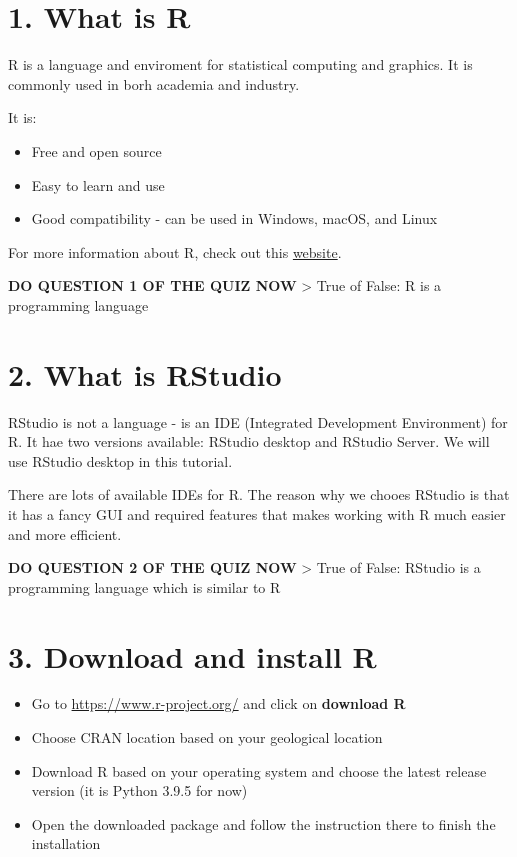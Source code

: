 \documentclass[
]{book}
\begin{document}
\hypertarget{what-is-r}{%
\section{1. What is R}\label{what-is-r}}

R is a language and enviroment for statistical computing and graphics. It is commonly used in borh academia and industry.

It is:

\begin{itemize}
\item
  Free and open source
\item
  Easy to learn and use
\item
  Good compatibility - can be used in Windows, macOS, and Linux
\end{itemize}

For more information about R, check out this \href{https://www.r-project.org/about.html}{website}.

\textbf{DO QUESTION 1 OF THE QUIZ NOW}
\textgreater{} True of False: R is a programming language

\hypertarget{what-is-rstudio}{%
\section{2. What is RStudio}\label{what-is-rstudio}}

RStudio is not a language - is an IDE (Integrated Development Environment) for R. It hae two versions available: RStudio desktop and RStudio Server. We will use RStudio desktop in this tutorial.

There are lots of available IDEs for R. The reason why we chooes RStudio is that it has a fancy GUI and required features that makes working with R much easier and more efficient.

\textbf{DO QUESTION 2 OF THE QUIZ NOW}
\textgreater{} True of False: RStudio is a programming language which is similar to R

\hypertarget{download-and-install-r}{%
\section{3. Download and install R}\label{download-and-install-r}}

\begin{itemize}
\item
  Go to \url{https://www.r-project.org/} and click on \textbf{download R}
\item
  Choose CRAN location based on your geological location
\item
  Download R based on your operating system and choose the latest release version (it is Python 3.9.5 for now)
\item
  Open the downloaded package and follow the instruction there to finish the installation
\end{itemize}
\end{document}
